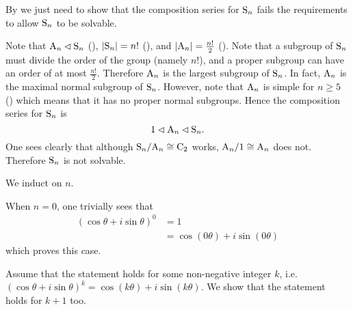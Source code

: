 \begin{questions}
    \item By  we just need to show that the composition series for $\mathrm{S}_{n}$ fails the requirements to allow $\mathrm{S}_{n}$ to be solvable.

    Note that $\mathrm{A}_{n} \lhd \mathrm{S}_{n}$ (), $|\mathrm{S}_{n}| = n!$ (), and $|\mathrm{A}_{n}| = \frac{n!}2$ (). Note that a subgroup of $\mathrm{S}_{n}$ must divide the order of the group (namely $n!$), and a proper subgroup can have an order of at most $\frac{n!}2$. Therefore $\mathrm{A}_{n}$ is the largest subgroup of $\mathrm{S}_{n}$. In fact, $\mathrm{A}_{n}$ is the maximal normal subgroup of $\mathrm{S}_{n}$. However, note that $\mathrm{A}_{n}$ is simple for $n \geq 5$ () which means that it has no proper normal subgroups. Hence the composition series for $\mathrm{S}_{n}$ is
    \[
        1 \lhd \mathrm{A}_{n} \lhd \mathrm{S}_{n}.
    \]
    One sees clearly that although $\mathrm{S}_{n}/\mathrm{A}_{n} \cong \mathrm{C}_{2}$ works, $\mathrm{A}_{n}/1 \cong \mathrm{A}_{n}$ does not. Therefore $\mathrm{S}_{n}$ is not solvable.

    \item \begin{partquestions}{\roman*}
        \item We induct on $n$.

        When $n = 0$, one trivially sees that
        \begin{align*}
            (\cos\theta + i\sin\theta)^0 &= 1\\
            &= \cos(0\theta) + i\sin(0\theta)
        \end{align*}
        which proves this case.

        Assume that the statement holds for some non-negative integer $k$, i.e. $(\cos\theta + i\sin\theta)^k = \cos(k\theta) + i\sin(k\theta)$. We show that the statement holds for $k+1$ too.


\end{partquestions}
\end{questions}
